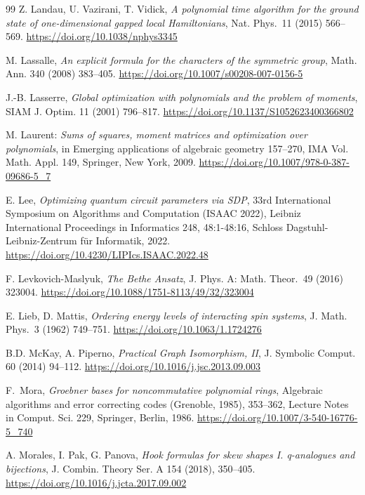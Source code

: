 \documentclass[12pt,dvipsnames,accepted=2016-08-18,a4paper,onecolumn]{quantumarticle}
\numberwithin{equation}{section}
\theoremstyle{definition}
\begin{document}
\begin{thebibliography}{99}
 Z. Landau, U. Vazirani, T. Vidick, \textit{A polynomial time algorithm
 for the ground state of one-dimensional gapped local Hamiltonians}, Nat.
 Phys.~11 (2015) 566--569.  \url{https://doi.org/10.1038/nphys3345}
 
M. Lassalle, 
\textit{An explicit formula for the characters of the symmetric group}, 
Math. Ann. 340 (2008) 383--405. \url{https://doi.org/10.1007/s00208-007-0156-5}

J.-B. Lasserre, 
\textit{Global optimization with polynomials and the problem of moments},
SIAM J. Optim. 11 (2001) 796--817. \url{https://doi.org/10.1137/S1052623400366802}

M. Laurent: 
\textit{Sums of squares, moment matrices and optimization over polynomials}, 
in Emerging applications of algebraic geometry 157--270, IMA Vol. Math. Appl. 149, Springer, New York, 2009. \url{https://doi.org/10.1007/978-0-387-09686-5_7}

 E. Lee, \textit{Optimizing quantum circuit parameters via SDP}, 33rd International Symposium on Algorithms and Computation  (ISAAC 2022), Leibniz International Proceedings in Informatics 248, 48:1-48:16, Schloss Dagstuhl-Leibniz-Zentrum f\"ur Informatik, 2022. 
 \url{https://doi.org/10.4230/LIPIcs.ISAAC.2022.48}

  F. Levkovich-Maslyuk, \textit{The Bethe Ansatz}, J. Phys. A: Math. Theor.~49 (2016) 323004. \url{https://doi.org/10.1088/1751-8113/49/32/323004}

E. Lieb, D. Mattis, \textit{Ordering energy levels of interacting
 spin systems}, J. Math. Phys.~3 (1962) 749--751. \url{https://doi.org/10.1063/1.1724276}

B.D. McKay, A. Piperno,
\textit{Practical Graph Isomorphism, II},
J. Symbolic Comput. 60 (2014) 94--112.
\url{https://doi.org/10.1016/j.jsc.2013.09.003}

F.~Mora, \textit{Groebner bases for noncommutative polynomial rings},
  Algebraic algorithms and error correcting codes (Grenoble, 1985), 353--362, Lecture Notes in Comput. Sci. 229, Springer,
 Berlin,
 1986.
 \url{https://doi.org/10.1007/3-540-16776-5_740}

A. Morales, I. Pak, G. Panova, 
\textit{Hook formulas for skew shapes I. q-analogues and bijections},
J. Combin. Theory Ser. A 154 (2018), 350--405.
\url{https://doi.org/10.1016/j.jcta.2017.09.002}


\end{thebibliography}
\end{document}

